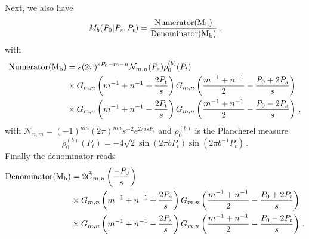 \documentclass[11pt]{article}
\begin{document}
Next, we also have 
\begin{equation}
    M_b(P_0|P_s,P_t)=\frac{\rm Numerator(M_b)}{\rm Denominator(M_b)}\,,
\end{equation}
with 
\begin{equation}
    \begin{aligned}
        \rm Numerator(M_b)&=s (2\pi)^{sP_0-m-n}\mathcal{N}_{m,n}(P_s)\rho_0^{(b)}(P_t)\\
        &\times G_{m,n}\left(m^{-1}+n^{-1}+\frac{2P_t}{s}\right)G_{m,n}\left(\frac{m^{-1}+n^{-1}}{2}-\frac{P_0+2P_s}{s}\right)\\
        &\times G_{m,n}\left(m^{-1}+n^{-1}-\frac{2P_t}{s}\right)G_{m,n}\left(\frac{m^{-1}+n^{-1}}{2}-\frac{P_0-2P_s}{s}\right)\,,
    \end{aligned}
\end{equation}
with $\mathcal{N}_{n,m}=(-1)^{nm}(2\pi)^{nm}s^{-2}e^{2\pi i s P_s}$ and $\rho_0^{(b)}$ is the Plancherel measure 
\[\rho_0^{(b)}(P_t)=-4\sqrt{2}\sin(2\pi b P_t)\sin(2\pi b^{-1} P_t)\,.\]
Finally the denominator reads
\begin{equation}
    \begin{aligned}
        \rm Denominator(M_b)&=2\tilde{G}_{m,n}\left(\frac{-P_0}{s}\right)\\
        &\times G_{m,n}\left(m^{-1}+n^{-1}+\frac{2P_s}{s}\right)G_{m,n}\left(\frac{m^{-1}+n^{-1}}{2}-\frac{P_0+2P_t}{s}\right)\\
        &\times G_{m,n}\left(m^{-1}+n^{-1}-\frac{2P_s}{s}\right)G_{m,n}\left(\frac{m^{-1}+n^{-1}}{2}-\frac{P_0-2P_t}{s}\right)\,.
    \end{aligned}
\end{equation}
\end{document}
